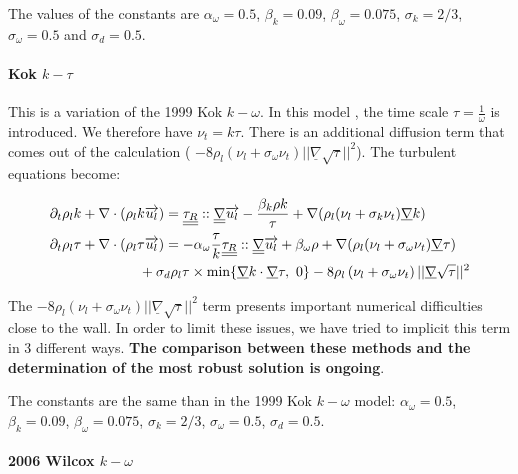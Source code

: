 The values of the constants are	$\alpha_{\omega} = 0.5$, $\beta_{k} = 0.09$, $\beta_{\omega} = 0.075$, $\sigma_k = 2/3$, $\sigma_{\omega} = 0.5$ and $\sigma_d = 0.5$.

\paragraph{Kok $k-\tau$}\mbox{}

This is a variation of the 1999 Kok $k-\omega$. In this model \cite{Ktau2000}, the time scale $\tau = \frac{1}{\omega}$ is introduced. We therefore have $\nu_t = k\tau$. There is an additional diffusion term that comes out of the calculation ( $- 8  \rho_l(\nu_l + \sigma_{\omega} \nu_t) ||\underline{\nabla}\sqrt{\tau}||^2$). The turbulent equations become:

\begin{align} \label{eq_tau}
		&\partial_t \rho_l k + \nabla \cdot ( \rho_l k \vec{u_l})
		=  \underline{\underline{\tau_R}}::\underline{\underline{\nabla}}\vec{u_l}
		- \frac{\beta_{k}\rho k}{\tau}
		+ \nabla( \rho_l(\nu_l + \sigma_k \nu_t) \underline{\nabla} k) \\
		&\begin{multlined}
		\partial_t  \rho_l \tau + \nabla \cdot ( \rho_l \tau \vec{u_l})
		=  - \alpha_{\omega}  \frac{\tau}{k}\underline{\underline{\tau_R}}::\underline{\underline{\nabla}}\vec{u_l}
	  	 + \beta_{\omega}\rho
		 +\nabla( \rho_l(\nu_l + \sigma_{\omega} \nu_t) \underline{\nabla} \tau)\\
 		 + \sigma_d \rho_l \tau \times{} \text{min}\acco{\underline{\nabla}k \cdot \underline{\nabla} \tau,\ 0}
 		 - 8  \rho_l\parent{\nu_l + \sigma_{\omega} \nu_t} ||\underline{\nabla}\sqrt{\tau}||^2
		\end{multlined}
\end{align}

The $- 8  \rho_l(\nu_l + \sigma_{\omega} \nu_t) ||\underline{\nabla}\sqrt{\tau}||^2$ term presents important numerical difficulties close to the wall. In order to limit these issues, we have tried to implicit this term in 3 different ways. \textbf{The comparison between these methods and the determination of the most robust solution is ongoing}.

The constants are the same than in the 1999 Kok $k-\omega$ model: $\alpha_{\omega} = 0.5$, $\beta_{k} = 0.09$, $\beta_{\omega} = 0.075$, $\sigma_k = 2/3$, $\sigma_{\omega} = 0.5$, $\sigma_d = 0.5$.

\paragraph{2006 Wilcox $k-\omega$}\mbox{}

